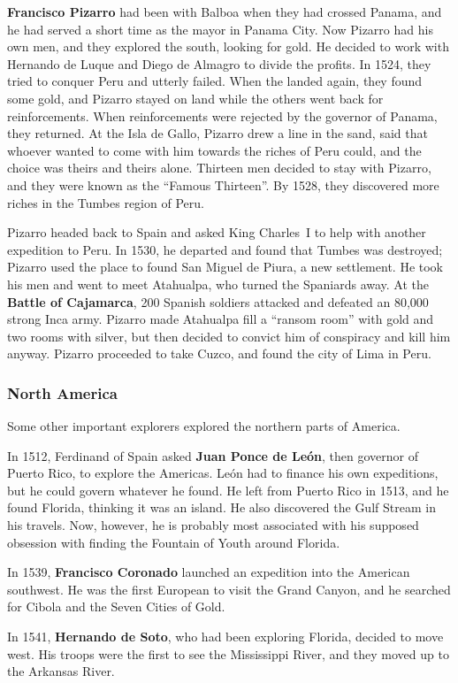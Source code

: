 \textbf{Francisco Pizarro} had been with Balboa when they had crossed Panama,
and he had served a short time as the mayor in Panama City.
Now Pizarro had his own men, and they explored the south, looking for gold.
He decided to work with Hernando de Luque and Diego de Almagro to divide the profits.
In 1524, they tried to conquer Peru and utterly failed.
When the landed again, they found some gold,
and Pizarro stayed on land while the others went back for reinforcements.
When reinforcements were rejected by the governor of Panama, they returned.
At the Isla de Gallo, Pizarro drew a line in the sand,
said that whoever wanted to come with him towards the riches of Peru could,
and the choice was theirs and theirs alone.
Thirteen men decided to stay with Pizarro, and they were known as the ``Famous Thirteen''.
By 1528, they discovered more riches in the Tumbes region of Peru.

Pizarro headed back to Spain and asked King Charles~I to help with another expedition to Peru.
In 1530, he departed and found that Tumbes was destroyed;
Pizarro used the place to found San Miguel de Piura, a new settlement.
He took his men and went to meet Atahualpa, who turned the Spaniards away.
At the \textbf{Battle of Cajamarca}, 200 Spanish soldiers attacked and defeated an 80,000 strong Inca army.
Pizarro made Atahualpa fill a ``ransom room'' with gold and two rooms with silver,
but then decided to convict him of conspiracy and kill him anyway.
Pizarro proceeded to take Cuzco, and found the city of Lima in Peru.

\subsubsection*{North America}

Some other important explorers explored the northern parts of America.

In 1512, Ferdinand of Spain asked \textbf{Juan Ponce de Le\'on},
then governor of Puerto Rico, to explore the Americas.
Le\'on had to finance his own expeditions, but he could govern whatever he found.
He left from Puerto Rico in 1513, and he found Florida, thinking it was an island.
He also discovered the Gulf Stream in his travels.
Now, however, he is probably most associated with his supposed obsession
with finding the Fountain of Youth around Florida.

In 1539, \textbf{Francisco Coronado} launched an expedition into the American southwest.
He was the first European to visit the Grand Canyon,
and he searched for Cibola and the Seven Cities of Gold.

In 1541, \textbf{Hernando de Soto}, who had been exploring Florida, decided to move west.
His troops were the first to see the Mississippi River, and they moved up to the Arkansas River.
